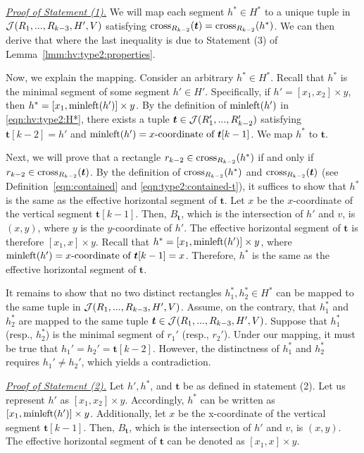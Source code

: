 \noindent \underline{\em Proof of Statement (1).} We will map each segment $h^* \in H^*$ to a unique tuple in $\mathcal{J}(R_1,...,R_{k-3},H',V)$ satisfying $\mathrm{cross}_{R_{k-2}}(\textrm{\boldmath${t}$}) = \mathrm{cross}_{R_{k-2}}(h^*)$. We can then derive that 
 where the last inequality is due to Statement (3) of Lemma~\ref{lmm:hv:type2:properties}.

\vgap 

Now, we explain the mapping. Consider an arbitrary $h^* \in H^*$. Recall that $h^*$ is the minimal segment of some segment $h' \in H'$. Specifically, if $h' = [x_1,x_2]\times y$, then $h^* = [x_1,\mathrm{minleft}(h')]\times y$. By the definition of $\mathrm{minleft}(h')$ in \eqref{eqn:hv:type2:H*}, there exists a tuple $\textrm{\boldmath${t}$}\in \mathcal{J}(R_1',...,R_{k-2}')$ satisfying $\bm{t}[k-2] = h'$ and $\mathrm{minleft}(h') = \text{$x$-coordinate of $\textrm{\boldmath${t}$}[k-1]$}$. We map $h^*$ to $\bm{t}$.

\vgap

Next, we will prove that a rectangle $r_{k-2} \in \mathrm{cross}_{R_{k-2}}(h^*)$ if and only if $r_{k-2} \in \mathrm{cross}_{R_{k-2}}(\textrm{\boldmath${t}$})$. By the definition of $\mathrm{cross}_{R_{k-2}}(h^*)$ and $\mathrm{cross}_{R_{k-2}}(\textrm{\boldmath${t}$})$ (see Definition~\eqref{eqn:contained} and \eqref{eqn:type2:contained-t}), it suffices to show that $h^*$ is the same as the effective horizontal segment of $\bm{t}$. Let $x$ be the $x$-coordinate of the vertical segment $\bm{t}[k-1]$. Then, $B_\bm{t}$, which is the intersection of $h'$ and $v$, is $(x,y)$, where $y$ is the $y$-coordinate of $h'$. The effective horizontal segment of $\bm{t}$ is therefore $[x_1,x]\times y$. Recall that $h^* = [x_1,\mathrm{minleft}(h')]\times y$, where $\mathrm{minleft}(h') = \text{$x$-coordinate of $\textrm{\boldmath${t}$}[k-1]$} = x$. Therefore, $h^*$ is the same as the effective horizontal segment of $\bm{t}$.



It remains to show that no two distinct rectangles $h_1^*, h_2^* \in H^*$ can be mapped to the same tuple in $\mathcal{J}(R_1,...,R_{k-3}, H',V)$. Assume, on the contrary, that $h_1^*$ and $h_2^*$ are mapped to the same tuple $\textrm{\boldmath${t}$}\in \mathcal{J}(R_1,...,R_{k-3}, H',V)$. Suppose that $h_1^*$ (resp., $h_2^*$) is the minimal segment of $r_1'$ (resp., $r_2'$). Under our mapping, it must be true that  $h_1' = h_2' = \bm{t}[k-2]$. However, the distinctness of $h_1^*$ and $h_2^*$ requires $h_1' \ne h_2'$, which yields a contradiction.

\extraspacing \underline{\em Proof of Statement (2).}
Let $h', h^*$, and $\bm{t}$ be as defined in statement (2). Let us represent $h'$ as $[x_1,x_2] \times y$. Accordingly, $h^*$ can be written as $[x_1, \mathrm{minleft}(h')] \times y$. Additionally, let $x$ be the x-coordinate of the vertical segment $\bm{t}[k-1]$. Then, $B_\bm{t}$, which is the intersection of $h'$ and $v$, is $(x,y)$. The effective horizontal segment of $\bm{t}$ can be denoted as $[x_1,x] \times y$. 

